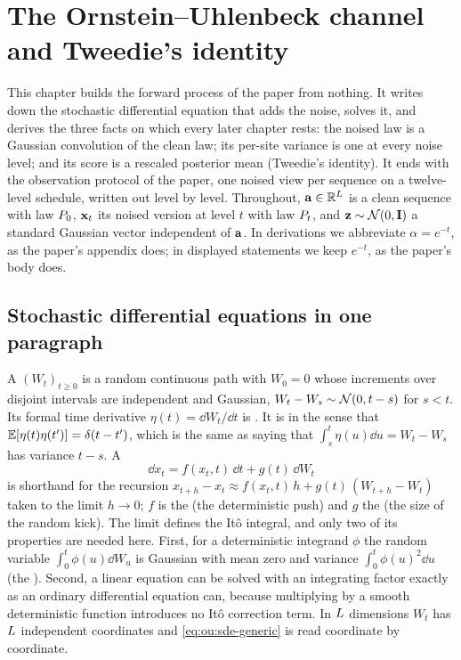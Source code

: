 \chapter{The Ornstein--Uhlenbeck channel and Tweedie's identity}
\label{ch:ou-channel-tweedie}

This chapter builds the forward process of the paper from nothing. It writes down the
stochastic differential equation that adds the noise, solves it, and derives the three
facts on which every later chapter rests: the noised law is a Gaussian convolution of
the clean law; its per-site variance is one at every noise level; and its score is a
rescaled posterior mean (Tweedie's identity). It ends with the observation protocol of
the paper, one noised view per sequence on a twelve-level schedule, written out level by
level. Throughout, $\mathbf{a}\in\mathbb{R}^{L}$ is a clean sequence with law $P_0$,
$\mathbf{x}_t$ its noised version at level $t$ with law $P_t$, and $\mathbf{z}\sim\mathcal{N}\!\left(0,\mathbf{I}\right)$ a
standard Gaussian vector independent of $\mathbf{a}$. In derivations we abbreviate
$\alpha=e^{-t}$, as the paper's appendix does; in displayed statements we keep
$e^{-t}$, as the paper's body does.

\section{Stochastic differential equations in one paragraph}
\label{sec:ou:sde}

A  $(W_t)_{t\ge0}$ is a random continuous path with $W_0=0$ whose
increments over disjoint intervals are independent and Gaussian,
$W_t-W_s\sim\mathcal{N}\!\left(0,t-s\right)$ for $s<t$. Its formal time derivative
$\eta(t)=\dd W_t/\dd t$ is . It is  in the sense
that $\mathbb{E}[\eta(t)\eta(t')]=\delta(t-t')$, which is the same as saying that
$\int_s^t\eta(u)\dd u=W_t-W_s$ has variance $t-s$. A 
\begin{equation}
  \dd x_t=f(x_t,t)\,\dd t+g(t)\,\dd W_t
  \label{eq:ou:sde-generic}
\end{equation}
is shorthand for the recursion $x_{t+h}-x_t\approx f(x_t,t)\,h+g(t)\,(W_{t+h}-W_t)$
taken to the limit $h\to0$; $f$ is the  (the deterministic push) and $g$ the
 (the size of the random kick). The limit defines the It\^o
integral, and only two of its properties are needed here. First, for a deterministic
integrand $\phi$ the random variable $\int_0^t\phi(u)\dd W_u$ is Gaussian with mean zero
and variance $\int_0^t\phi(u)^2\dd u$ (the ). Second, a linear
equation can be solved with an integrating factor exactly as an ordinary differential
equation can, because multiplying by a smooth deterministic function introduces no
It\^o correction term. In $L$ dimensions $W_t$ has $L$ independent
coordinates and \cref{eq:ou:sde-generic} is read coordinate by coordinate.

